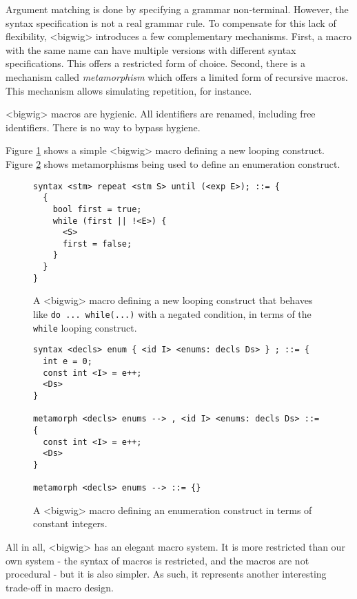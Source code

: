 Argument matching is done by specifying a grammar non-terminal. However, the
syntax specification is not a real grammar rule. To compensate for this lack of
flexibility, <bigwig> introduces a few complementary mechanisms. First, a macro
with the same name can have multiple versions with different syntax
specifications. This offers a restricted form of choice. Second, there is a
mechanism called \emph{metamorphism} which offers a limited form of recursive
macros. This mechanism allows simulating repetition, for instance.

<bigwig> macros are hygienic. All identifiers are renamed, including free
identifiers. There is no way to bypass hygiene.

Figure \ref{bigwig_repeat} shows a simple <bigwig> macro defining a new looping
construct. Figure \ref{bigwig_enum} shows metamorphisms being used to define an
enumeration construct.

\begin{figure}[here]
\small
\begin{lstlisting}[frame=single]
syntax <stm> repeat <stm S> until (<exp E>); ::= {
  {
    bool first = true;
    while (first || !<E>) {
      <S>
      first = false;
    }
  }
}
\end{lstlisting}
\caption{A <bigwig> macro defining a new looping construct that behaves like
  \texttt{do ... while(...)} with a negated condition, in terms of the
  \texttt{while} looping construct.}
\label{bigwig_repeat}
\end{figure}

\begin{figure}[here]
\small
\begin{lstlisting}[frame=single]
syntax <decls> enum { <id I> <enums: decls Ds> } ; ::= {
  int e = 0;
  const int <I> = e++;
  <Ds>
}

metamorph <decls> enums --> , <id I> <enums: decls Ds> ::= {
  const int <I> = e++;
  <Ds>
}

metamorph <decls> enums --> ::= {}
\end{lstlisting}
\caption{A <bigwig> macro defining an enumeration construct in terms of constant
  integers.}
\label{bigwig_enum}
\end{figure}

All in all, <bigwig> has an elegant macro system. It is more restricted than our
own system - the syntax of macros is restricted, and the macros are not
procedural - but it is also simpler. As such, it represents another interesting
trade-off in macro design.

